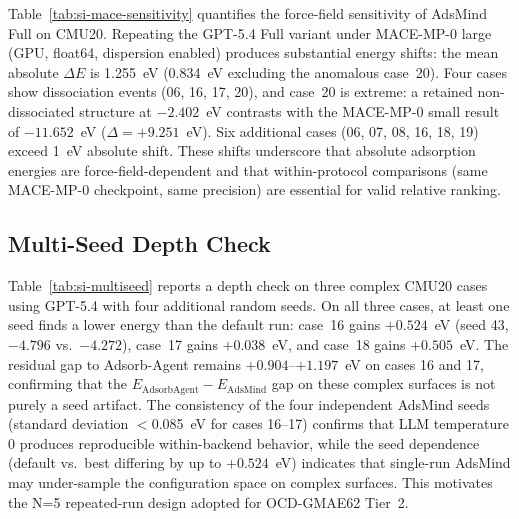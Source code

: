 \documentclass[%
 preprint,
 superscriptaddress,
 amsmath,amssymb,
 aps,
 prb,
 floatfix,
]{revtex4-2}
\begin{document}
Table~\ref{tab:si-mace-sensitivity} quantifies the force-field sensitivity of AdsMind Full on CMU20. Repeating the GPT-5.4 Full variant under MACE-MP-0 large (GPU, float64, dispersion enabled) produces substantial energy shifts: the mean absolute $\Delta E$ is 1.255~eV (0.834~eV excluding the anomalous case~20). Four cases show dissociation events (06, 16, 17, 20), and case~20 is extreme: a retained non-dissociated structure at $-2.402$~eV contrasts with the MACE-MP-0 small result of $-11.652$~eV ($\Delta = +9.251$~eV). Six additional cases (06, 07, 08, 16, 18, 19) exceed 1~eV absolute shift. These shifts underscore that absolute adsorption energies are force-field-dependent and that within-protocol comparisons (same MACE-MP-0 checkpoint, same precision) are essential for valid relative ranking.

\subsection{Multi-Seed Depth Check}

\begin{table}[ht]
\centering
\scriptsize
\caption{GPT-5.4 multi-seed depth check on three complex CMU cases. ``Default'' is the original GPT-5.4 Full run; seeds 43--46 are independent reruns. Gain = $E_\mathrm{default} - E_\mathrm{best}$; residual gap = $E_\mathrm{best} - E_\mathrm{AdsorbAgent}$.}
\label{tab:si-multiseed}
\end{table}

Table~\ref{tab:si-multiseed} reports a depth check on three complex CMU20 cases using GPT-5.4 with four additional random seeds. On all three cases, at least one seed finds a lower energy than the default run: case~16 gains $+0.524$~eV (seed 43, $-4.796$ vs.\ $-4.272$), case~17 gains $+0.038$~eV, and case~18 gains $+0.505$~eV. The residual gap to Adsorb-Agent remains $+0.904$--$+1.197$~eV on cases 16 and 17, confirming that the $E_{\mathrm{AdsorbAgent}} - E_{\mathrm{AdsMind}}$ gap on these complex surfaces is not purely a seed artifact. The consistency of the four independent AdsMind seeds (standard deviation $<$0.085~eV for cases 16--17) confirms that LLM temperature 0 produces reproducible within-backend behavior, while the seed dependence (default vs.\ best differing by up to $+0.524$~eV) indicates that single-run AdsMind may under-sample the configuration space on complex surfaces. This motivates the N=5 repeated-run design adopted for OCD-GMAE62 Tier~2.
\end{document}

